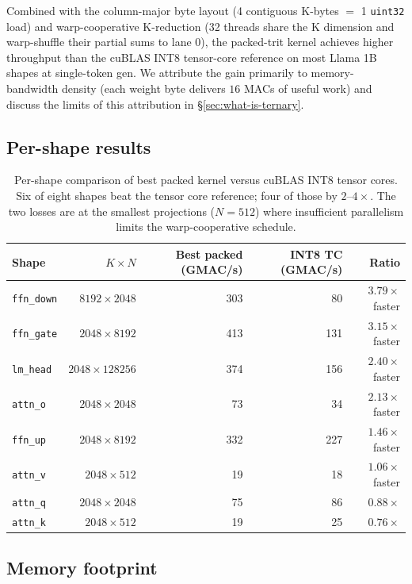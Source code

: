 \documentclass{article}
\begin{document}
Combined with the column-major byte layout (4 contiguous K-bytes $=$ 1
\texttt{uint32} load) and warp-cooperative K-reduction (32 threads share
the K dimension and warp-shuffle their partial sums to lane 0), the
packed-trit kernel achieves higher throughput than the cuBLAS {INT8}
tensor-core reference on most Llama 1B shapes at single-token gen.
We attribute the gain primarily to memory-bandwidth density (each weight
byte delivers $16$ {MAC}s of useful work) and discuss the limits of
this attribution in \S\ref{sec:what-is-ternary}.

\subsection{Per-shape results}

\begin{table}[h]
\centering
\small
\begin{tabular}{lrrrr}
\toprule
Shape & $K \times N$ & Best packed (GMAC/s) & {INT8} TC (GMAC/s) & Ratio \\
\midrule
\texttt{ffn\_down} & $8192 \times 2048$ & 303 & 80 & $\mathbf{3.79\times}$ faster \\
\texttt{ffn\_gate} & $2048 \times 8192$ & 413 & 131 & $\mathbf{3.15\times}$ faster \\
\texttt{lm\_head} & $2048 \times 128256$ & 374 & 156 & $\mathbf{2.40\times}$ faster \\
\texttt{attn\_o} & $2048 \times 2048$ & 73 & 34 & $\mathbf{2.13\times}$ faster \\
\texttt{ffn\_up} & $2048 \times 8192$ & 332 & 227 & $1.46\times$ faster \\
\texttt{attn\_v} & $2048 \times 512$ & 19 & 18 & $1.06\times$ faster \\
\texttt{attn\_q} & $2048 \times 2048$ & 75 & 86 & $0.88\times$ \\
\texttt{attn\_k} & $2048 \times 512$ & 19 & 25 & $0.76\times$ \\
\bottomrule
\end{tabular}
\caption{Per-shape comparison of best packed kernel versus cuBLAS {INT8}
tensor cores. Six of eight shapes beat the tensor core reference; four
of those by $2$--$4\times$. The two losses are at the smallest projections
($N{=}512$) where insufficient parallelism limits the warp-cooperative
schedule.}
\end{table}

\subsection{Memory footprint}
\end{document}
